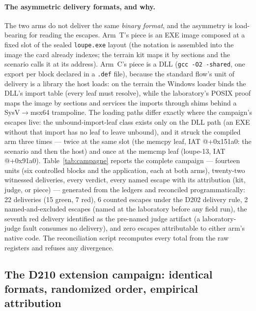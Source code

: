 \documentclass[11pt,a4paper]{article}
\newcommand{\code}[1]{\texttt{\small #1}}
\begin{document}
\paragraph{The asymmetric delivery formats, and why.} The two arms do
not deliver the same \emph{binary format}, and the asymmetry is
load-bearing for reading the escapes. Arm~T's piece is an EXE image
composed at a fixed slot of the sealed \code{loupe.exe} layout (the
notation is assembled into the image the card already indexes; the
terrain kit maps it by sections and the scenario calls it at its
address). Arm~C's piece is a DLL (\code{gcc -O2 -shared}, one export
per block declared in a \code{.def} file), because the standard flow's
unit of delivery is a library the host loads: on the terrain the
Windows loader binds the DLL's import table (every leaf must resolve),
while the laboratory's POSIX proof maps the image by sections and
services the imports through shims behind a SysV$\to$msx64 trampoline.
The loading paths differ exactly where the campaign's escapes live:
the unbound-import-leaf class exists only on the DLL path (an EXE
without that import has no leaf to leave unbound), and it struck the
compiled arm three times --- twice at the same slot (the memcpy leaf,
IAT @+0x151a0: the scenario and then the host) and once at the memcmp
leaf (loupe-13, IAT @+0x91a0). Table~\ref{tab:campagne}
reports the complete campaign --- fourteen units (six controlled blocks
and the application, each at both arms), twenty-two witnessed
deliveries, every verdict, every named escape with its attribution
(kit, judge, or piece) --- generated from the ledgers and reconciled
programmatically: 22 deliveries (15 green, 7 red), 6 counted escapes
under the D202 delivery rule, 2 named-and-excluded escapes (named at
the laboratory before any field run), the seventh red delivery
identified as the pre-named judge artifact (a laboratory-judge fault
consumes no delivery), and zero escapes attributable to either arm's
native code. The reconciliation script recomputes every total from the
raw registers and refuses any divergence.



\subsection{The D210 extension campaign: identical formats, randomized
order, empirical attribution}\label{sec:d210}
\end{document}
